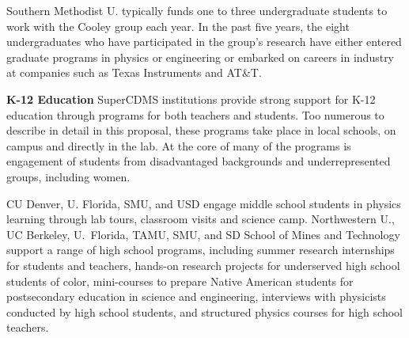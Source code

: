 Southern Methodist U. typically funds one to three undergraduate students to work with the Cooley group each year. In the past five years, the eight undergraduates who have participated in the group’s research have either entered graduate programs in physics or engineering or embarked on careers in industry at companies such as Texas Instruments and AT\&T.  


\textbf{K-12 Education}
SuperCDMS institutions provide strong support for K-12 education through programs for both teachers and students. Too numerous to describe in detail in this proposal, these programs take place in local schools, on campus and directly in the lab. At the core of many of the programs is engagement of students from disadvantaged backgrounds and underrepresented groups, including women. 

CU Denver, U. Florida, SMU, and USD engage middle school students in physics learning through lab tours, classroom visits and science camp. Northwestern U., UC Berkeley, U.~Florida, TAMU, SMU, and SD School of Mines and Technology support a range of high school programs, including summer research internships for students and teachers, hands-on research projects for underserved high school students of color, mini-courses to prepare Native American students for postsecondary education in science and engineering, interviews with physicists conducted by high school students, and structured physics courses for high school teachers. 

